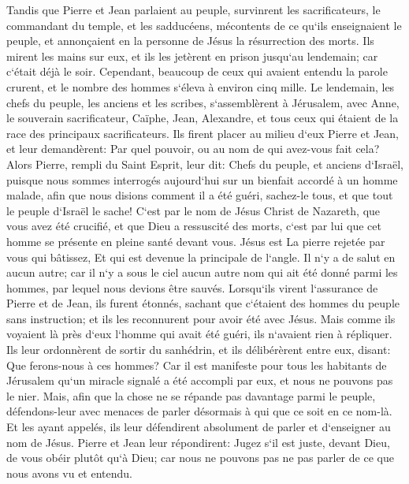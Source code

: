 \verse Tandis que Pierre et Jean parlaient au peuple, survinrent les sacrificateurs, le commandant du temple, et les sadducéens, 
\verse mécontents de ce qu`ils enseignaient le peuple, et annonçaient en la personne de Jésus la résurrection des morts. 
\verse Ils mirent les mains sur eux, et ils les jetèrent en prison jusqu`au lendemain; car c`était déjà le soir. 
\verse Cependant, beaucoup de ceux qui avaient entendu la parole crurent, et le nombre des hommes s`éleva à environ cinq mille. 
\verse Le lendemain, les chefs du peuple, les anciens et les scribes, s`assemblèrent à Jérusalem, 
\verse avec Anne, le souverain sacrificateur, Caïphe, Jean, Alexandre, et tous ceux qui étaient de la race des principaux sacrificateurs. 
\verse Ils firent placer au milieu d`eux Pierre et Jean, et leur demandèrent: Par quel pouvoir, ou au nom de qui avez-vous fait cela? 
\verse Alors Pierre, rempli du Saint Esprit, leur dit: Chefs du peuple, et anciens d`Israël, 
\verse puisque nous sommes interrogés aujourd`hui sur un bienfait accordé à un homme malade, afin que nous disions comment il a été guéri, 
\verse sachez-le tous, et que tout le peuple d`Israël le sache! C`est par le nom de Jésus Christ de Nazareth, que vous avez été crucifié, et que Dieu a ressuscité des morts, c`est par lui que cet homme se présente en pleine santé devant vous. 
\verse Jésus est La pierre rejetée par vous qui bâtissez, Et qui est devenue la principale de l`angle. 
\verse Il n`y a de salut en aucun autre; car il n`y a sous le ciel aucun autre nom qui ait été donné parmi les hommes, par lequel nous devions être sauvés. 
\verse Lorsqu`ils virent l`assurance de Pierre et de Jean, ils furent étonnés, sachant que c`étaient des hommes du peuple sans instruction; et ils les reconnurent pour avoir été avec Jésus. 
\verse Mais comme ils voyaient là près d`eux l`homme qui avait été guéri, ils n`avaient rien à répliquer. 
\verse Ils leur ordonnèrent de sortir du sanhédrin, et ils délibérèrent entre eux, disant: Que ferons-nous à ces hommes? 
\verse Car il est manifeste pour tous les habitants de Jérusalem qu`un miracle signalé a été accompli par eux, et nous ne pouvons pas le nier. 
\verse Mais, afin que la chose ne se répande pas davantage parmi le peuple, défendons-leur avec menaces de parler désormais à qui que ce soit en ce nom-là. 
\verse Et les ayant appelés, ils leur défendirent absolument de parler et d`enseigner au nom de Jésus. 
\verse Pierre et Jean leur répondirent: Jugez s`il est juste, devant Dieu, de vous obéir plutôt qu`à Dieu; 
\verse car nous ne pouvons pas ne pas parler de ce que nous avons vu et entendu. 

